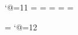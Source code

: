 
\catcode`@=11 %
\chardef\l@USenglish=\language
\chardef\l@english=\language
\newlanguage\l@german \language=\l@german
\chardef\l@austrian=\language
\chardef\l@french=\language

\language=\l@USenglish
\catcode`@=12 %
\def\fmtname{schlicht}\def\fmtversion{3.141592653} %

